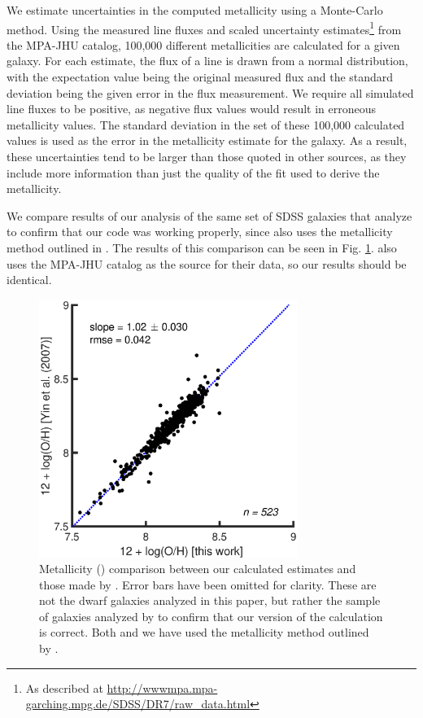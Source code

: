 We estimate uncertainties in the computed metallicity using a Monte-Carlo 
method.  Using the measured line fluxes and scaled uncertainty 
estimates\footnote{As described at 
\url{http://wwwmpa.mpa-garching.mpg.de/SDSS/DR7/raw_data.html}} from the 
MPA-JHU catalog, 100,000 different metallicities are calculated for a given 
galaxy.  For each estimate, the flux of a line is drawn from a normal 
distribution, with the expectation value being the original measured flux and 
the standard deviation being the given error in the flux measurement.  
We require all simulated line fluxes to be positive, as negative flux values 
would result in erroneous metallicity values.  The standard deviation in the set 
of these 100,000 calculated values is used as the error in the metallicity 
estimate for the galaxy.  As a result, these uncertainties tend to be larger 
than those quoted in other sources, as they include more information than just 
the quality of the fit used to derive the metallicity.

We compare results of our analysis of the same set of SDSS galaxies that 
\cite{Yin07} analyze to confirm that our code was working properly, since 
\cite{Yin07} also uses the metallicity method outlined in \cite{Izotov06}.  The 
results of this comparison can be seen in Fig. \ref{fig:Yin07_comp}.  
\cite{Yin07} also uses the MPA-JHU catalog as the source for their data, so our 
results should be identical.

\begin{figure}
    \centering
    \includegraphics[width=0.75\textwidth]{Images/Paper1/Yin07_comparison_fit}
    \caption[Metallicity comparison to \cite{Yin07}]{Metallicity (\OH) 
    comparison between our calculated estimates and those made by \cite{Yin07}.  
    Error bars have been omitted for clarity.  These are not the dwarf galaxies 
    analyzed in this paper, but rather the sample of galaxies analyzed by 
    \cite{Yin07} to confirm that our version of the calculation is correct.  
    Both \cite{Yin07} and we have used the metallicity method outlined by 
    \cite{Izotov06}.}
    \label{fig:Yin07_comp}
\end{figure}


